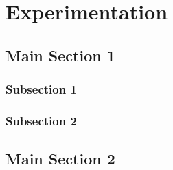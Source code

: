 
\chapter{Experimentation} %

\label{Chapter4} %



\section{Main Section 1}


\subsection{Subsection 1}




\subsection{Subsection 2}



\section{Main Section 2}

